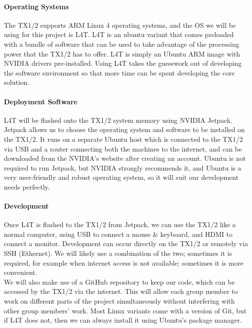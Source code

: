 \documentclass[letterpaper,10pt,serif,draftclsnofoot,onecolumn,compsoc,titlepage]{IEEEtran}
\begin{document}
\paragraph{Operating Systems}

The TX1/2 supports ARM Linux 4 operating systems, and the OS we will be using for this 
project is L4T. L4T is an ubuntu variant that comes preloaded with a 
bundle of software that can be used to take advantage of the processing power that 
the TX1/2 has to offer. L4T is simply an Ubuntu ARM image with NVIDIA drivers 
pre-installed. Using L4T takes the guesswork out of developing the software 
environment so that more time can be spent developing the core solution. \\

\paragraph{Deployment Software}

L4T will be flashed onto the TX1/2 system memory using NVIDIA Jetpack. Jetpack allows 
us to choose the operating system and software to be installed on the TX1/2. It runs on 
a separate Ubuntu host which is connected to the TX1/2 via USB and a router connecting 
both the machines to the internet, and can be downloaded from the NVIDIA's website 
after creating an account. Ubuntu is not required to run Jetpack, but NVIDIA strongly 
recommends it, and Ubuntu is a very user-friendly and robust operating system, so it 
will suit our development needs perfectly. \\

\paragraph{Development}

Once L4T is flashed to the TX1/2 from Jetpack, we can use the TX1/2 like a normal 
computer, using USB to connect a mouse \& keyboard, and HDMI to connect a monitor. 
Development can occur directly on the TX1/2 or remotely via SSH (Ethernet). We will 
likely use a combination of the two; sometimes it is required, for example when 
internet access is not available; sometimes it is more convenient. \\

We will also make use of a GitHub repository to keep our code, which can be accessed 
by the TX1/2 via the internet. This will allow each group member to work on different 
parts of the project simultaneously without interfering with other group members' 
work. Most Linux variants come with a version of Git, but if L4T does not, then we 
can always install it using Ubuntu's package manager. \\
\end{document}
